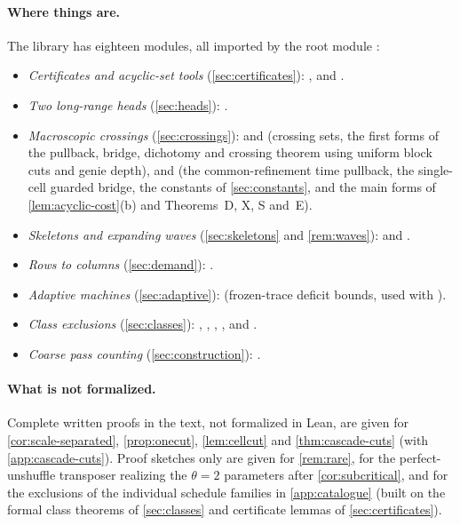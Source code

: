 \paragraph{Where things are.} The library  has eighteen modules, all imported by the root module
:
\begin{itemize}[leftmargin=1.5em]\raggedright
\item \emph{Certificates and acyclic-set tools} (\cref{sec:certificates}): ,
 and .
\item \emph{Two long-range heads} (\cref{sec:heads}): .
\item \emph{Macroscopic crossings} (\cref{sec:crossings}):  and
 (crossing sets, the first forms of the pullback, bridge, dichotomy and crossing theorem using
uniform block cuts and genie depth), and  (the common-refinement time pullback, the single-cell guarded
bridge, the constants of \cref{sec:constants}, and the main forms of \cref{lem:acyclic-cost}(b) and Theorems~D, X, S and~E).
\item \emph{Skeletons and expanding waves} (\cref{sec:skeletons} and \cref{rem:waves}):  and
.
\item \emph{Rows to columns} (\cref{sec:demand}): .
\item \emph{Adaptive machines} (\cref{sec:adaptive}):  (frozen-trace deficit bounds, used with
).
\item \emph{Class exclusions} (\cref{sec:classes}): , ,
, ,  and
.
\item \emph{Coarse pass counting} (\cref{sec:construction}): .
\end{itemize}

\paragraph{What is not formalized.} Complete written proofs in the text, not formalized in Lean, are given for
\cref{cor:scale-separated}, \cref{prop:onecut}, \cref{lem:cellcut} and \cref{thm:cascade-cuts} (with \cref{app:cascade-cuts}). Proof sketches only are given for \cref{rem:rare}, for the perfect-unshuffle
transposer realizing the $\theta=2$ parameters after \cref{cor:subcritical}, and for the exclusions of the individual schedule
families in \cref{app:catalogue} (built on the formal class theorems of \cref{sec:classes} and certificate lemmas of
\cref{sec:certificates}).

